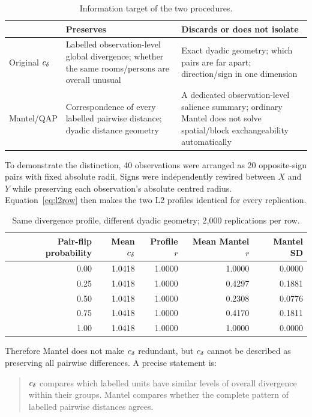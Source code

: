 \begin{table}[ht]
\centering
\caption{Information target of the two procedures.}
\small
\begin{tabular}{p{}p{}p{}}
\hline
 & Preserves & Discards or does not isolate\\
\hline
Original $c_\delta$ & Labelled observation-level global divergence; whether the
same rooms/persons are overall unusual & Exact dyadic geometry; which pairs
are far apart; direction/sign in one dimension\\
Mantel/QAP & Correspondence of every labelled pairwise distance; dyadic
distance geometry & A dedicated observation-level salience summary; ordinary
Mantel does not solve spatial/block exchangeability automatically\\
\hline
\end{tabular}
\end{table}

To demonstrate the distinction, 40 observations were arranged as 20
opposite-sign pairs with fixed absolute radii. Signs were independently
rewired between $X$ and $Y$ while preserving each observation's absolute
centred radius. Equation~\eqref{eq:l2row} then makes the two L2 profiles
identical for every replication.

\begin{table}[ht]
\centering
\caption{Same divergence profile, different dyadic geometry; 2,000
replications per row.}
\small
\begin{tabular}{rrrrr}
\hline
Pair-flip probability & Mean $c_\delta$ & Profile $r$ & Mean Mantel $r$ & Mantel SD\\
\hline
0.00 & 1.0418 & 1.0000 & 1.0000 & 0.0000\\
0.25 & 1.0418 & 1.0000 & 0.4297 & 0.1881\\
0.50 & 1.0418 & 1.0000 & 0.2308 & 0.0776\\
0.75 & 1.0418 & 1.0000 & 0.4170 & 0.1811\\
1.00 & 1.0418 & 1.0000 & 1.0000 & 0.0000\\
\hline
\end{tabular}
\end{table}

Therefore Mantel does not make $c_\delta$ redundant, but $c_\delta$ cannot be described
as preserving all pairwise differences. A precise statement is:

\begin{quote}
$c_\delta$ compares which labelled units have similar levels of overall divergence
within their groups. Mantel compares whether the complete pattern of labelled
pairwise distances agrees.
\end{quote}

